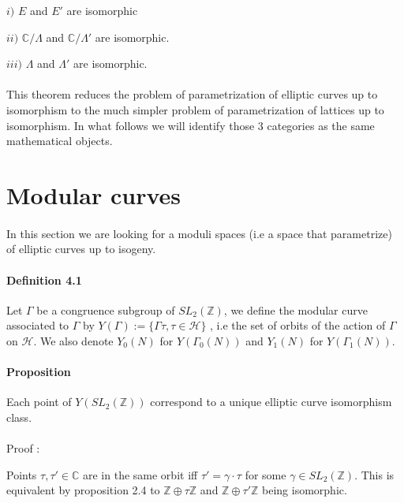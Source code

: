 \documentclass[letterpaper,10pt]{article}
\begin{document}
  $i)$ $E$ and $E'$ are isomorphic
  
  $ii)$  $\mathbb{C}/\Lambda$ and $\mathbb{C}/\Lambda'$ are isomorphic.
  
  $iii)$  $\Lambda$ and $\Lambda'$ are isomorphic. \\ 
  
{\itshape \paragraph{}This theorem reduces the problem of parametrization of elliptic curves up to isomorphism to the much simpler problem of parametrization of
 lattices up to isomorphism. In what follows we will identify those 3 categories as the same mathematical objects.
}

\section{Modular curves}%

{\itshape \paragraph{} In this section we are looking for a moduli spaces (i.e a space that parametrize) of elliptic curves up to isogeny. 
}



\paragraph{Definition 4.1} Let $\Gamma$ be a congruence subgroup of $SL_2(\mathbb{Z})$, we define the modular curve associated to $\Gamma$ by
 $Y(\Gamma) := \{ \Gamma\tau , \tau \in \mathcal{H} \}$ , i.e the set of orbits of the action of $\Gamma$ on $\mathcal{H}$. We also denote $Y_0(N)$ for $Y(\Gamma_0(N))$
 and $Y_1(N)$ for $Y(\Gamma_1(N))$.


\paragraph{Proposition } Each point of $Y(SL_2(\mathbb{Z}))$ correspond to a unique elliptic curve isomorphism class.

{\itshape \paragraph{}Proof : } Points $\tau, \tau' \in \mathbb{C}$ are in the same orbit iff $\tau' = \gamma \cdot \tau$ for some $\gamma \in SL_2(\mathbb{Z})$.
This is equivalent by proposition  2.4 to $\mathbb{Z} \oplus \tau\mathbb{Z}$ and $\mathbb{Z} \oplus \tau'\mathbb{Z}$ being isomorphic.
\end{document}
